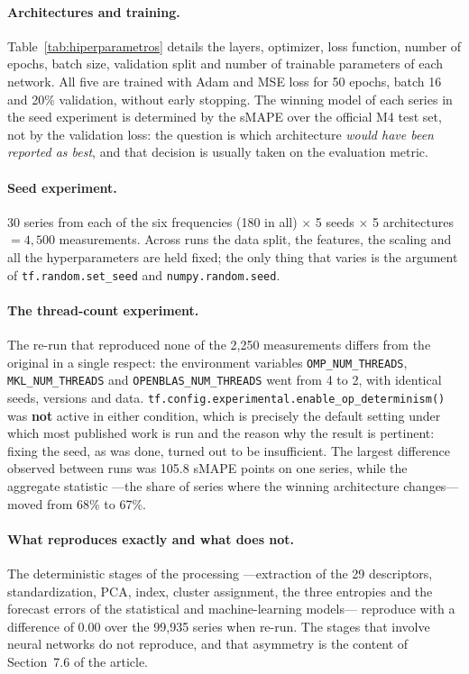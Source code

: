\paragraph{Architectures and training.} Table~\ref{tab:hiperparametros} details the
layers, optimizer, loss function, number of epochs, batch size, validation split and
number of trainable parameters of each network. All five are trained with Adam and MSE
loss for 50 epochs, batch 16 and 20\% validation, without early stopping. The winning
model of each series in the seed experiment is determined by the sMAPE over the official
M4 test set, not by the validation loss: the question is which architecture \emph{would
have been reported as best}, and that decision is usually taken on the evaluation
metric.

\paragraph{Seed experiment.} 30 series from each of the six frequencies (180 in all)
$\times$ 5 seeds $\times$ 5 architectures $=4{,}500$ measurements. Across runs the data
split, the features, the scaling and all the hyperparameters are held fixed; the only
thing that varies is the argument of \texttt{tf.random.set\_seed} and
\texttt{numpy.random.seed}.

\paragraph{The thread-count experiment.} The re-run that reproduced none of the
2{,}250 measurements differs from the original in a single respect: the environment
variables \texttt{OMP\_NUM\_THREADS}, \texttt{MKL\_NUM\_THREADS} and
\texttt{OPENBLAS\_NUM\_THREADS} went from 4 to 2, with identical seeds, versions and
data. \texttt{tf.config.experimental.enable\_op\_determinism()} was \textbf{not} active
in either condition, which is precisely the default setting under which most published
work is run and the reason why the result is pertinent: fixing the seed, as was done,
turned out to be insufficient. The largest difference observed between runs was 105.8
sMAPE points on one series, while the aggregate statistic ---the share of series where
the winning architecture changes--- moved from 68\% to 67\%.

\paragraph{What reproduces exactly and what does not.} The deterministic stages of the
processing ---extraction of the 29 descriptors, standardization, PCA, index, cluster
assignment, the three entropies and the forecast errors of the statistical and
machine-learning models--- reproduce with a difference of $0.00$ over the 99{,}935
series when re-run. The stages that involve neural networks do not reproduce, and that
asymmetry is the content of Section~7.6 of the article.

